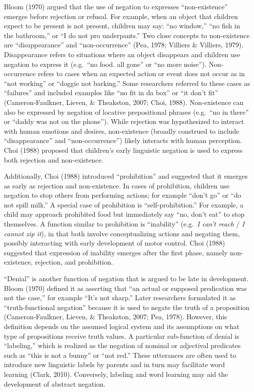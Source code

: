 \documentclass[
  english,
  man,floatsintext]{apa6}
\begin{document}
Bloom (1970) argued that the use of negation to expresses ``non-existence'' emerges before rejection or refusal. For example, when an object that children expect to be present is not present, children may say: ``no window,'' ``no fish in the bathroom,'' or ``I do not pro underpants.'' Two close concepts to non-existence are ``disappearance'' and ``non-occurrence'' (Pea, 1978; Villiers \& Villiers, 1979). Disappearance refers to situations where an object disappears and children use negation to express it (e.g.~``no food. all gone'' or ``no more noise''). Non-occurrence refers to cases when an expected action or event does not occur as in ``not working'' or ``doggie not barking.'' Some researchers referred to these cases as ``failures'' and included examples like ``no fit in da box'' or ``it don't fit'' (Cameron-Faulkner, Lieven, \& Theakston, 2007; Choi, 1988). Non-existence can also be expressed by negation of locative prepositional phrases (e.g.~``no in there'' or ``daddy was not on the phone''). While rejection was hypothesized to interact with human emotions and desires, non-existence (broadly construed to include ``disappearance'' and ``non-occurrence'') likely interacts with human perception. Choi (1988) proposed that children's early linguistic negation is used to express both rejection and non-existence.

Additionally, Choi (1988) introduced ``prohibition'' and suggested that it emerges as early as rejection and non-existence. In cases of prohibition, children use negation to stop others from performing actions; for example ``don't go'' or ``do not spill milk.'' A special case of prohibition is ``self-prohibition.'' For example, a child may approach prohibited food but immediately say ``no, don't eat'' to stop themselves. A function similar to prohibition is ``inability'' (e.g.~\emph{I can't reach} / \emph{I cannot zip it}), in that both involve conceptualizing actions and negating them, possibly interacting with early development of motor control. Choi (1988) suggested that expression of inability emerges after the first phase, namely non-existence, rejection, and prohibition.

``Denial'' is another function of negation that is argued to be late in development. Bloom (1970) defined it as asserting that ``an actual or supposed predication was not the case,'' for example ``It's not sharp.'' Later researchers formulated it as ``truth-functional negation'' because it is used to negate the truth of a proposition (Cameron-Faulkner, Lieven, \& Theakston, 2007; Pea, 1978). However, this definition depends on the assumed logical system and its assumptions on what type of propositions receive truth values. A particular sub-function of denial is ``labeling,'' which is realized as the negation of nominal or adjectival predicates such as ``this is not a bunny'' or ``not red.'' These utterances are often used to introduce new linguistic labels by parents and in turn may facilitate word learning (Clark, 2010). Conversely, labeling and word learning may aid the development of abstract negation.
\end{document}
